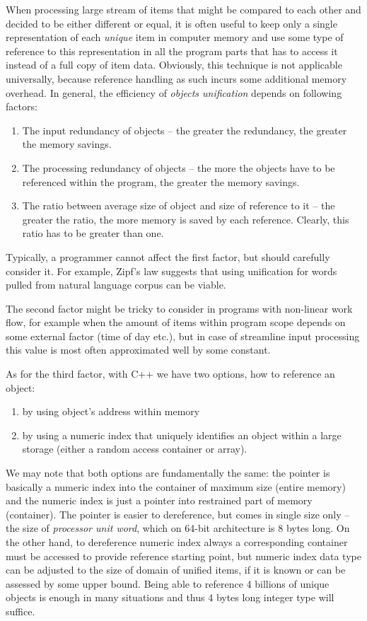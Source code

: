 When processing large stream of items that might be compared to each other
and decided to be either different or equal, it is often useful to keep only
a single representation of each \emph{unique} item in computer memory and use
some type of reference to this representation in all the program parts that
has to access it instead of a full copy of item data.
Obviously, this technique is not applicable universally, because reference
handling as such incurs some additional memory overhead.
In general, the efficiency of \emph{objects unification} depends on following
factors:
\begin{enumerate}
  \item The input redundancy of objects -- the greater the redundancy, the greater
  the memory savings.
  \item The processing redundancy of objects -- the more the objects have to be
  referenced within the program, the greater the memory savings.
  \item The ratio between average size of object and size of reference to it
  -- the greater the ratio, the more memory is saved by each reference.
  Clearly, this ratio has to be greater than one.
\end{enumerate}

Typically, a programmer cannot affect the first factor, but should carefully consider it.
For example, Zipf's law \citep[Chapter 1]{manning:stat-nlp} suggests that using
unification for words pulled from natural language corpus can be viable.

The second factor might be tricky to consider in programs with non-linear work flow,
for example when the amount of items within program scope depends on some external
factor (time of day etc.), but in case of streamline input processing this value is
most often approximated well by some constant.

As for the third factor, with C++ we have two options, how to reference an object:
\begin{enumerate}
  \item by using object's address within memory
  \item by using a numeric index that uniquely identifies an object within a large storage
  (either a random access container or array).
\end{enumerate}

We may note that both options are fundamentally the same:
the pointer is basically a numeric index into the container of maximum size (entire memory)
and the numeric index is just a pointer into restrained part of memory (container).
The pointer is easier to dereference, but comes in single size only -- the size of
\emph{processor unit word}, which on 64-bit architecture is 8 bytes long.
On the other hand, to dereference numeric index always a corresponding container must be
accessed to provide reference starting point, but numeric index data type can be adjusted to
the size of domain of unified items, if it is known or can be assessed by some upper bound.
Being able to reference 4 billions of unique objects is enough in many situations and
thus 4 bytes long integer type will suffice.

